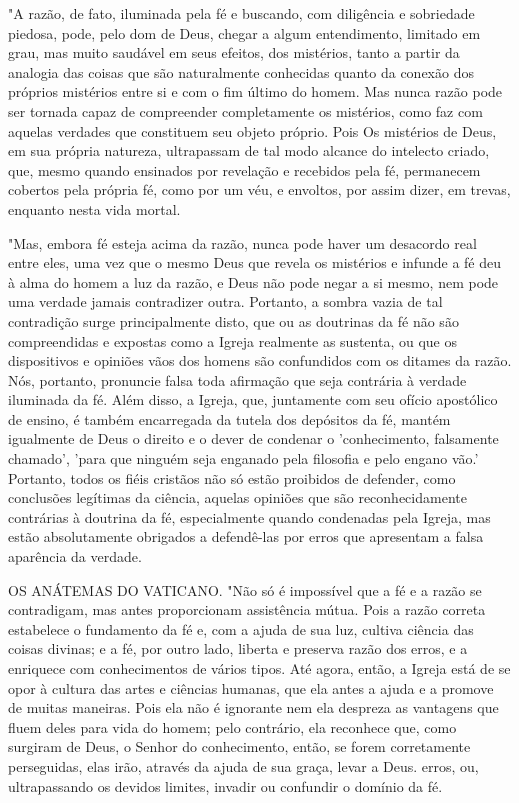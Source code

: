\documentclass[11pt,a5paper,twoside,openany]{book}
\begin{document}
"A razão, de fato, iluminada pela fé e buscando, com diligência e sobriedade piedosa, pode, pelo dom de Deus, chegar a algum entendimento, limitado em grau, mas muito saudável em seus efeitos, dos mistérios, tanto a partir da analogia das coisas que são naturalmente conhecidas quanto da conexão dos próprios mistérios entre si e com o fim último do homem. Mas nunca razão pode ser tornada capaz de compreender completamente os mistérios, como faz com aquelas verdades que constituem seu objeto próprio. Pois Os mistérios de Deus, em sua própria natureza, ultrapassam de tal modo alcance do intelecto criado, que, mesmo quando ensinados por revelação e recebidos pela fé, permanecem cobertos pela própria fé, como por um véu, e envoltos, por assim dizer, em trevas, enquanto nesta vida mortal.

"Mas, embora fé esteja acima da razão, nunca pode haver um desacordo real entre eles, uma vez que o mesmo Deus que revela os mistérios e infunde a fé deu à alma do homem a luz da razão, e Deus não pode negar a si mesmo, nem pode uma verdade jamais contradizer outra. Portanto, a sombra vazia de tal contradição surge principalmente disto, que ou as doutrinas da fé não são compreendidas e expostas como a Igreja realmente as sustenta, ou que os dispositivos e opiniões vãos dos homens são confundidos com os ditames da razão. Nós, portanto, pronuncie falsa toda afirmação que seja contrária à verdade iluminada da fé. Além disso, a Igreja, que, juntamente com seu ofício apostólico de ensino, é também encarregada da tutela dos depósitos da fé, mantém igualmente de Deus o direito e o dever de condenar o 'conhecimento, falsamente chamado', 'para que ninguém seja enganado pela filosofia e pelo engano vão.' Portanto, todos os fiéis cristãos não só estão proibidos de defender, como conclusões legítimas da ciência, aquelas opiniões que são reconhecidamente contrárias à doutrina da fé, especialmente quando condenadas pela Igreja, mas estão absolutamente obrigados a defendê-las por erros que apresentam a falsa aparência da verdade.

OS ANÁTEMAS DO VATICANO. "Não só é impossível que a fé e a razão se contradigam, mas antes proporcionam assistência mútua. Pois a razão correta estabelece o fundamento da fé e, com a ajuda de sua luz, cultiva ciência das coisas divinas; e a fé, por outro lado, liberta e preserva razão dos erros, e a enriquece com conhecimentos de vários tipos. Até agora, então, a Igreja está de se opor à cultura das artes e ciências humanas, que ela antes a ajuda e a promove de muitas maneiras. Pois ela não é ignorante nem ela despreza as vantagens que fluem deles para vida do homem; pelo contrário, ela reconhece que, como surgiram de Deus, o Senhor do conhecimento, então, se forem corretamente perseguidas, elas irão, através da ajuda de sua graça, levar a Deus. erros, ou, ultrapassando os devidos limites, invadir ou confundir o domínio da fé.
\end{document}
